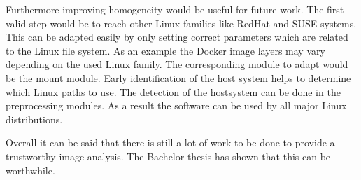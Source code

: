 Furthermore improving homogeneity would be useful for future work.
The first valid step would be to reach other Linux families like RedHat and SUSE systems.
This can be adapted easily by only setting correct parameters which are related to the Linux file system.
As an example the Docker image layers may vary depending on the used Linux family.
The corresponding module to adapt would be the mount module.
Early identification of the host system helps to determine which Linux paths to use.
The detection of the hostsystem can be done in the preprocessing modules.
As a result the software can be used by all major Linux distributions.

Overall it can be said that there is still a lot of work to be done to provide a trustworthy image analysis.
The Bachelor thesis has shown that this can be worthwhile.